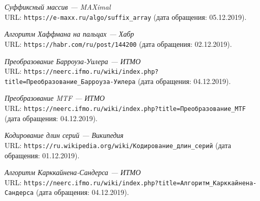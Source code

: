 \begin{thebibliography}{99}
{\itshape Суффиксный массив — MAXimal} \\URL: \texttt{https://e-maxx.ru/algo/suffix\_array} (дата обращения: 05.12.2019).

{\itshape Алгоритм Хаффмана на пальцах — Хабр} \\URL: \texttt{https://habr.com/ru/post/144200} (дата обращения: 02.12.2019). 

{\itshape Преобразование Барроуза-Уилера — ИТМО} \\URL: \texttt{https://neerc.ifmo.ru/wiki/index.php?title=Преобразование\_Барроуза-Уилера} (дата обращения: 04.12.2019). 

{\itshape Преобразование MTF — ИТМО} \\URL: \texttt{https://neerc.ifmo.ru/wiki/index.php?title=Преобразование\_MTF} (дата обращения: 04.12.2019). 

{\itshape Кодирование длин серий — Википедия} \\URL:
\texttt{https://ru.wikipedia.org/wiki/Кодирование\_длин\_серий} (дата обращения: 01.12.2019). 

{\itshape Алгоритм Карккайнена-Сандерса — ИТМО} \\URL: \texttt{https://neerc.ifmo.ru/wiki/index.php?title=Алгоритм\_Карккайнена-Сандерса} (дата обращения: 04.12.2019). 

\end{thebibliography}
\pagebreak

